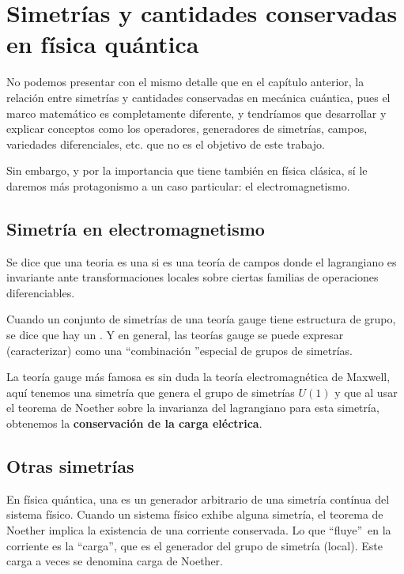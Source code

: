 
\chapter{Simetrías y cantidades conservadas en física quántica}\label{ch:simetrias-y-cantidades-conservadas-en-fisica-quantica}

No podemos presentar con el mismo detalle que en el capítulo anterior, la relación entre simetrías y cantidades conservadas en mecánica cuántica, pues el marco matemático es completamente diferente, y tendríamos que desarrollar y explicar conceptos como los operadores, generadores de simetrías, campos, variedades diferenciales, etc. que no es el objetivo de este trabajo.

Sin embargo, y por la importancia que tiene también en física clásica, sí le daremos más protagonismo a un caso particular: el electromagnetismo.

\section{Simetría en electromagnetismo}\label{sec:simetria-en-electromagnetismo}

Se dice que una teoria es una  si es una teoría de campos donde el lagrangiano es invariante ante transformaciones locales sobre ciertas familias de operaciones diferenciables\autocite{MAQFT}.

Cuando un conjunto de simetrías de una teoría gauge tiene estructura de grupo, se dice que hay un .
Y en general, las teorías gauge se puede expresar (caracterizar) como una \textquotedblleft combinación \textquotedblright especial de grupos de simetrías.

La teoría gauge más famosa es sin duda la teoría electromagnética de Maxwell, aquí tenemos una simetría que genera el grupo de simetrías $U(1)$ y que al usar el teorema de Noether sobre la invarianza del lagrangiano para esta simetría, obtenemos la \textbf{conservación de la carga eléctrica}.

\section{Otras simetrías}\label{sec:otras-simetrias}

En física quántica, una  es un generador arbitrario de una simetría contínua del sistema físico.
Cuando un sistema físico exhibe alguna simetría, el teorema de Noether implica la existencia de una corriente conservada.
Lo que \textquotedblleft fluye\textquotedblright\ en la corriente es la \textquotedblleft carga\textquotedblright, que es el generador del grupo de simetría (local).
Este carga a veces se denomina carga de Noether\autocite{W-CARGA}.

